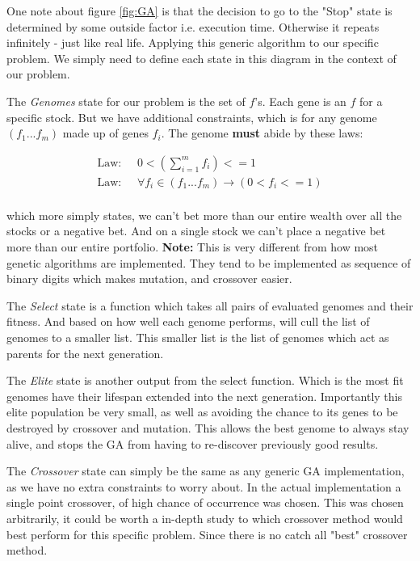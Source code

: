 \documentclass[11pt]{article}
\begin{document}
    One note about figure \ref{fig:GA} is that the decision to go to the "Stop"
    state is determined by some outside factor i.e. execution time. Otherwise
    it repeats infinitely - just like real life. Applying this generic algorithm to 
    our specific problem. We simply need to
    define each state in this diagram in the context of our problem.

    The \textit{Genomes} state for our problem is the set of \(f\)'s. Each gene is an
    \(f\) for a specific stock. But we have additional constraints, which is for 
    any genome \((f_1...f_m)\) made up of genes \(f_i\). The genome \textbf{must}
    abide by these laws:

    \begin{align*}
        \text{Law: } & \;
        0 < \left(
            \displaystyle\sum^{m}_{i=1} f_i
        \right) <= 1 \\
        \text{Law: } & \;
        \forall f_i \in (f_1...f_m) \to \left(
            0 < f_i <= 1
        \right) \\
    \end{align*}

    which more simply states, we can't bet more than our entire wealth over all the stocks or
    a negative bet. And on a single stock we can't place a negative bet more than our
    entire portfolio. \textbf{Note:} This is very different from how most genetic algorithms
    are implemented. They tend to be implemented as sequence of binary digits which makes
    mutation, and crossover easier. 

    The \textit{Select} state is a function which takes all pairs of evaluated genomes
    and their fitness. And based on how well each genome performs, will cull the
    list of genomes to a smaller list. This smaller list is the list of genomes
    which act as parents for the next generation.

    The \textit{Elite} state is another output from the select function. Which is
    the most fit genomes have their lifespan extended into the next generation.
    Importantly this elite population be very small, as well as avoiding the
    chance to its genes to be destroyed by crossover and mutation. \cite{DeJong}
    This allows the best genome to always stay alive, and stops the GA from
    having to re-discover previously good results.

    The \textit{Crossover} state can simply be the same as any generic GA implementation,
    as we have no extra constraints to worry about. In the actual implementation
    a single point crossover, of high chance of occurrence was chosen. This was
    chosen arbitrarily, it could be worth a in-depth study to which crossover
    method would best perform for this specific problem. Since there is no catch all
    "best" crossover method.
\end{document}
